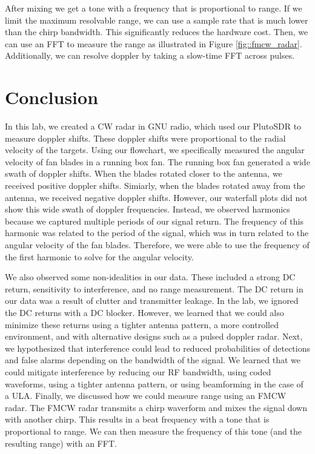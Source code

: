 \documentclass{article}
\begin{document}
\noindent After mixing we get a tone with a frequency that is proportional to range. If we limit the maximum resolvable range, we can use a sample rate that is much lower than the chirp bandwidth. This significantly reduces the hardware cost. Then, we can use an FFT to measure the range as illustrated in Figure \ref{fig::fmcw_radar}. Additionally, we can resolve doppler by taking a slow-time FFT across pulses.

\section{Conclusion}

In this lab, we created a CW radar in GNU radio, which used our PlutoSDR to measure doppler shifts. These doppler shifts were proportional to the radial velocity of the targets. Using our flowchart, we specifically measured the angular velocity of fan blades in a running box fan. The running box fan generated a wide swath of doppler shifts. When the blades rotated closer to the antenna, we received positive doppler shifts. Simiarly, when the blades rotated away from the antenna, we received negative doppler shifts. However, our waterfall plots did not show this wide swath of doppler frequencies. Instead, we observed harmonics because we captured multiple periods of our signal return. The frequency of this harmonic was related to the period of the signal, which was in turn related to the angular velocity of the fan blades. Therefore, we were able to use the frequency of the first harmonic to solve for the angular velocity.

We also observed some non-idealities in our data. These included a strong DC return, sensitivity to interference, and no range measurement. The DC return in our data was a result of clutter and transmitter leakage. In the lab, we ignored the DC returns with a DC blocker. However, we learned that we could also minimize these returns using a tighter antenna pattern, a more controlled environment, and with alternative designs such as a pulsed doppler radar. Next, we hypothesized that interference could lead to reduced probabilities of detections and false alarms depending on the bandwidth of the signal. We learned that we could mitigate interference by reducing our RF bandwidth, using coded waveforms, using a tighter antenna pattern, or using beamforming in the case of a ULA. Finally, we discussed how we could measure range using an FMCW radar. The FMCW radar transmits a chirp waverform and mixes the signal down with another chirp. This results in a beat frequency with a tone that is proportional to range. We can then measure the frequency of this tone (and the resulting range) with an FFT. 
 




{}
\end{document}
